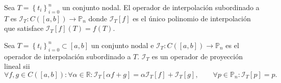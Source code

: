 \begin{frame}
	\begin{definition}
		Sea
		\begin{math}
			T=
			{
			\left\{
			t_{i}
			\right\}
			}^{n}_{i=0}
		\end{math}
		un conjunto nodal.
		El \alert{operador de interpolación} subordinado a $T$ es
		\begin{math}
			\mathcal{I}_{T}:
			C\left(\left[a,b\right]\right)\to
			\mathbb{P}_{n}
		\end{math}
		donde
		\begin{math}
			\mathcal{I}_{T}
			\left[f\right]
		\end{math}
		es el único polinomio de interpolación
		que satisface
		\begin{math}
			\mathcal{I}_{T}
			\left[f\right]
			\left(T\right)=
			f\left(T\right)
		\end{math}.
	\end{definition}

	\begin{theorem}
		Sea
		\begin{math}
			T=
			{
			\left\{
			t_{i}
			\right\}
			}^{n}_{i=0}
			\subset\left[a,b\right]
		\end{math}
		un conjunto nodal e
		\begin{math}
			\mathcal{I}_{T}:
			C\left(\left[a,b\right]\right)\to
			\mathbb{P}_{n}
		\end{math}
		es el operador de interpolación subordinado a $T$.
		\begin{math}
			\mathcal{I}_{T}
		\end{math}
		es un \alert{operador de proyección lineal} sii
		\begin{equation*}
			\forall f,g\in C\left(\left[a,b\right]\right):
			\forall\alpha\in\mathbb{R}:
			\mathcal{I}_{T}\left[\alpha f+g\right]=
			\alpha\mathcal{I}_{T}\left[f\right]+
			\mathcal{I}_{T}\left[g\right],\qquad
			\forall p\in\mathbb{P}_{n}:
			\mathcal{I}_{T}\left[p\right]=
			p.
		\end{equation*}
	\end{theorem}


\end{frame}
